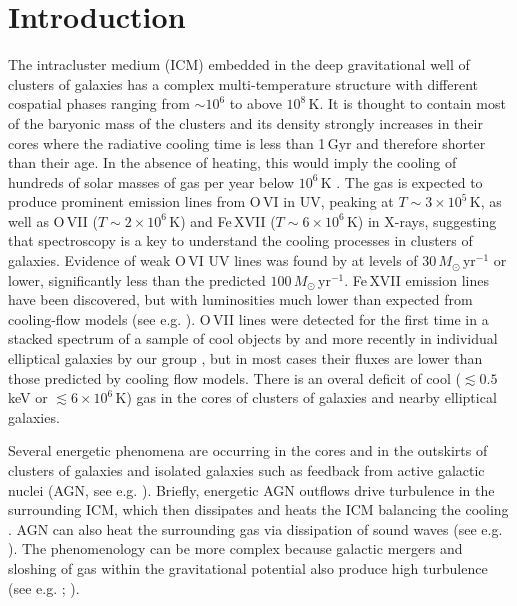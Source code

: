 \documentclass[useAMS,usenatbib]{mn2e}
\begin{document}
\section{Introduction}
\label{sec:intro}

The intracluster medium (ICM) embedded in the deep gravitational well
of clusters of galaxies has a complex multi-temperature structure 
with different cospatial phases ranging from $\sim10^{6}$ to above $10^{8}$\,K. 
It is thought to contain most of the baryonic mass of the clusters 
and its density strongly increases in their cores 
where the radiative cooling time is less than 1\,Gyr
and therefore shorter than their age. 
In the absence of heating, this would imply the cooling
of hundreds of solar masses of gas per year below $10^{6}$\,K \citep{Fabian1994}. 
The gas is expected to produce prominent emission lines 
from O\,{\small VI} in UV, peaking at $T\sim3\times10^{5}$\,K, 
as well as O\,{\small VII} ($T\sim2\times10^{6}$\,K) 
and Fe\,{\small XVII} ($T\sim6\times10^{6}$\,K) in X-rays,
suggesting that spectroscopy is a key to understand the cooling processes
in clusters of galaxies.
Evidence of weak O\,{\small VI} UV lines was found by \cite{Bregman2005,Bregman2006}
at levels of $30\,M_{\odot}$\,yr$^{-1}$ or lower,
significantly less than the predicted $100\,M_{\odot}$\,yr$^{-1}$. 
Fe\,{\small XVII} emission lines have been discovered, 
but with luminosities much lower than expected from cooling-flow models 
(see e.g. \citealt{Peterson2003}). 
O\,{\small VII} lines were detected for the first time in a stacked spectrum 
of a sample of cool objects by \cite{Sanders2011} and more recently in individual 
elliptical galaxies by our group \citep{Pinto2014}, but in most cases their fluxes 
are lower than those predicted by cooling flow models.
There is an overal deficit of cool ($\lesssim0.5$\,keV 
or $\lesssim6\times10^{6}$\,K) gas in the cores of clusters 
of galaxies and nearby elliptical galaxies.

Several energetic phenomena are occurring 
in the cores and in the outskirts of clusters of galaxies and isolated galaxies
such as feedback from active galactic nuclei (AGN, see e.g.
\citealt{Churazov2000,McNamara2007,Fabian2012}). Briefly, energetic AGN outflows
drive turbulence in the surrounding ICM, which then dissipates and heats the ICM 
balancing the cooling \citep[see e.g.][]{Zhuravleva2014}.
{AGN can also heat the surrounding gas via dissipation of sound waves
(see e.g.  \citealt{Fabian2003_waves,Fabian2005_waves}).}
The phenomenology can be more complex because galactic mergers and
sloshing of gas within the gravitational potential also produce high turbulence
(see e.g. \citealt{Ascasibar2006}; \citealt{Lau2009}).
\end{document}
